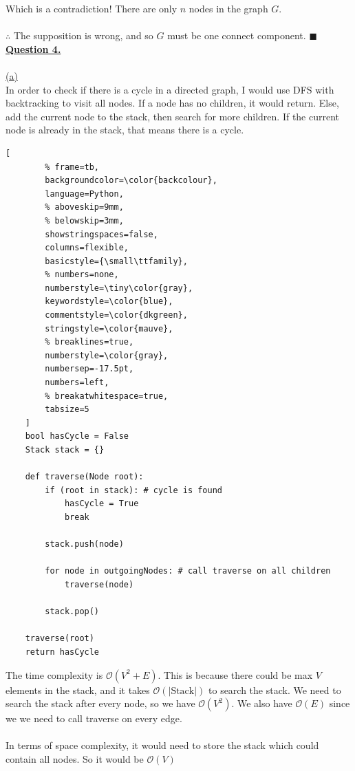 \documentclass[12pt]{article}
\newcommand{\code}[1]{{\ttfamily \fontseries{b}\selectfont #1}}
\def \calO {\mathcal{O}}
\renewcommand{\qed}{\hfill$\blacksquare$}
\begin{document}
Which is a contradiction! There are only $n$ nodes in the graph $G$.
\\\\
$\therefore$ The supposition is wrong, and so $G$ must be one connect component. \qed
\newpage
{{\LARGE \noindent \underline{\textbf{Question 4.}}}}
\\\\
\noindent \hyperlink{toc}{\hypertarget{4.1}{(a)}}\\
In order to check if there is a cycle in a directed graph, I would use DFS with backtracking to visit all nodes. If a node has no children, it would return. Else, add the current node to the stack, then search for more children. If the current node is already in the stack, that means there is a cycle.
\begin{lstlisting}[
		% frame=tb,
		backgroundcolor=\color{backcolour},
		language=Python,
		% aboveskip=9mm,
		% belowskip=3mm,
		showstringspaces=false,
		columns=flexible,
		basicstyle={\small\ttfamily},
		% numbers=none,
		numberstyle=\tiny\color{gray},
		keywordstyle=\color{blue},
		commentstyle=\color{dkgreen},
		stringstyle=\color{mauve},
		% breaklines=true,
		numberstyle=\color{gray},
		numbersep=-17.5pt,  
		numbers=left,
		% breakatwhitespace=true,
		tabsize=5
	]
	bool hasCycle = False
	Stack stack = {}

	def traverse(Node root):
		if (root in stack): # cycle is found
			hasCycle = True
			break 

		stack.push(node)

		for node in outgoingNodes: # call traverse on all children
			traverse(node)

		stack.pop()

	traverse(root)
	return hasCycle
\end{lstlisting}
The time complexity is $\mathcal{O}(V^2+E)$. This is because there could be max $V$ elements in the stack, and it takes $\mathcal{O}{(|\text{Stack}|)}$ to search the stack. We need to search the stack after every node, so we have $\calO(V^2)$. We also have $\calO(E)$ since we we need to call \code{traverse} on every edge.
\\\\
In terms of space complexity, it would need to store the stack which could contain all nodes. So it would be $\calO(V)$
\end{document}
